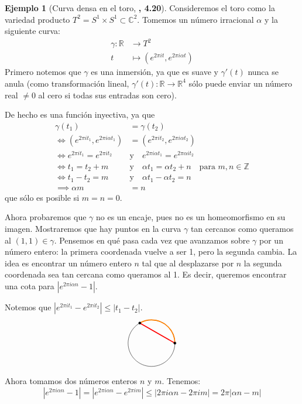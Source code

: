 \documentclass[spanish]{book}
\theoremstyle{definition}
\newtheorem*{ejem}{Ejemplo}
\newcommand{\R}{\mathbb{R}}
\newcommand{\Z}{\mathbb{Z}}
\newcommand{\C}{\mathbb{C}}
\begin{document}
	\begin{ejem}[Curva densa en el toro, \cite{Lee} \textbf{, 4.20}]
		Consideremos el toro como la variedad producto $T^2=S^1\times S^1\subset\C^2$. Tomemos un número irracional $\alpha$ y la siguiente curva:
		\begin{align*}
			\gamma:\R&\to T^2\\
			t&\mapsto(e^{2\pi it},e^{2\pi i\alpha t})
		\end{align*}
		Primero notemos que $\gamma$ es una inmersión, ya que es suave y $\gamma'(t)$ nunca se anula (como transformación lineal, $\gamma'(t):\R\to\R^4$ sólo puede enviar un número real $\neq0$ al cero si todas sus entradas son cero).
		
		De hecho es una función inyectiva, ya que
		\begin{align*}
			\gamma(t_1)&=\gamma(t_2)\\
			\iff (e^{2 \pi it_1},e^{2\pi i\alpha t_1})&=(e^{2\pi it_2},e^{2\pi i\alpha t_2})\\
			\iff e^{2\pi it_1}=e^{2\pi it_2}\quad&\text{y}\quad e^{2\pi i\alpha t_1}=e^{2\pi\alpha it_2}\\
			\iff t_1=t_2+m\quad&\text{y}\quad\alpha t_1=\alpha t_2+n\quad\text{para }m,n\in\Z\\
			\iff t_1-t_2=m\quad&\text{y}\quad \alpha t_1-\alpha t_2=n\\
			\implies\alpha m&=n
		\end{align*}
		que sólo es posible si $m=n=0$.
		
		Ahora probaremos que $\gamma$ no es un encaje, pues no es un homeomorfismo en su imagen. Mostraremos que hay puntos en la curva $\gamma$ tan cercanos como queramos al $(1,1)\in \gamma$. Pensemos en qué pasa cada vez que avanzamos sobre $\gamma$ por un número entero: la primera coordenada vuelve a ser 1, pero la segunda cambia. La idea es encontrar un número entero $n$ tal que al desplazarse por $n$ la segunda coordenada sea tan cercana como queramos al 1. Es decir, queremos encontrar una cota para $|e^{2\pi i\alpha n}-1|$.
		
		Notemos que $|e^{2\pi it_1}-e^{2\pi it_2}|\leq|t_1-t_2|$.
		\[\begin{tikzpicture}
			\draw (0,0) circle (1);
			\draw[very thick,orange] (1,0) arc (0:120:1);
			\draw[very thick, red] (1,0)--(-.5,.866);
			\draw[fill=black] (-.5,.866) circle (0.05);
			\draw[fill=black] (1,0) circle (0.05);
		\end{tikzpicture}\]
		Ahora tomamos dos números enteros $n$ y $m$. Tenemos:
		\[|e^{2\pi i\alpha n}-1|=|e^{2\pi i\alpha n}-e^{2\pi im}|\leq|2\pi i\alpha n-2\pi im|=2\pi|\alpha n-m|\]
		

\end{ejem}
\end{document}
